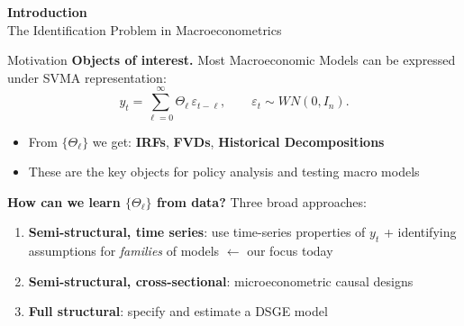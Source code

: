 \documentclass[aspectratio=169,11pt]{beamer}
\begin{document}
\begin{frame}[plain]
    \begin{center}
        {\Large \textbf{Introduction}}\\[1em]
        {\large The Identification Problem in Macroeconometrics}
    \end{center}
\end{frame}

\begin{frame}{Motivation}
    \textbf{Objects of interest.} Most Macroeconomic Models can be expressed under SVMA representation:
    \[
    y_t = \sum_{\ell=0}^{\infty} \Theta_\ell\, \varepsilon_{t-\ell}, \qquad \varepsilon_t \sim WN(0, I_n).
    \]
    \begin{itemize}
        \item From $\{\Theta_\ell\}$ we get: \textbf{IRFs}, \textbf{FVDs}, \textbf{Historical Decompositions}
        \item These are the key objects for policy analysis and testing macro models
    \end{itemize}

    \vspace{0.5em}

    \textbf{How can we learn $\{\Theta_\ell\}$ from data?} Three broad approaches:
    \begin{enumerate}
        \item \textbf{Semi-structural, time series}: use time-series properties of $y_t$ + identifying assumptions for \textit{families} of models \textcolor{mitred}{$\leftarrow$ our focus today}
        \item \textbf{Semi-structural, cross-sectional}: microeconometric causal designs
        \item \textbf{Full structural}: specify and estimate a DSGE model
    \end{enumerate}
\end{frame}
\end{document}
